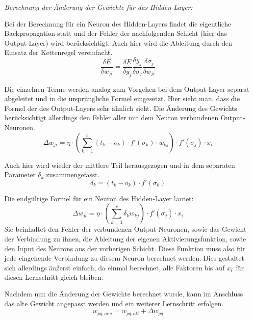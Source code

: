 \emph{Berechnung der Änderung der Gewichte für das Hidden-Layer:}

Bei der Berechnung für ein Neuron des Hidden-Layers findet die eigentliche Backpropagation statt und der Fehler der nachfolgenden Schicht (hier das Output-Layer) wird berücksichtigt. Auch hier wird die Ableitung durch den Einsatz der Kettenregel vereinfacht.
\begin{equation}
\frac{\delta E}{\delta w_{ji}} = \frac{\delta E}{\delta y_j} \frac{\delta y_j}{\delta\sigma_j}\frac{\delta\sigma_j}{\delta w_{ji}}
\end{equation}

Die einzelnen Terme werden analog zum Vorgehen bei dem Output-Layer separat abgeleitet und in die ursprüngliche Formel eingesetzt. Hier sieht man, dass die Formel der des Output-Layers sehr ähnlich sieht. Die Änderung des Gewichts berücksichtigt allerdings den Fehler aller mit dem Neuron verbundenen Output-Neuronen.
\begin{equation}
\Delta w_{ji} = \eta \cdot \left(\sum_{k=1}^{c}(t_k-o_k)\cdot f'(\sigma_k)\cdot w_{kj}\right) \cdot f'(\sigma_j) \cdot x_i
\end{equation}

Auch hier wird wieder der mittlere Teil herausgezogen und in dem separaten Parameter $\delta_k$ zusammengefasst.
\begin{equation}
\delta_k = (t_k-o_k)\cdot f'(\sigma_k)
\end{equation}

Die endgültige Formel für ein Neuron des Hidden-Layer lautet:
\begin{equation}
\Delta w_{ji}=\eta \cdot \left(\sum_{k=1}^{c} \delta_k w_{kj}\right)\cdot f'(\sigma_j)\cdot x_i
\end{equation}
Sie beinhaltet den Fehler der verbundenen Output-Neuronen, sowie das Gewicht der Verbindung zu ihnen, die Ableitung der eigenen Aktivierungsfunktion, sowie den Input des Neurons aus der vorherigen Schicht. Diese Funktion muss also für jede eingehende Verbindung zu diesem Neuron berechnet werden. Dies gestaltet sich allerdings äußerst einfach, da einmal berechnet, alle Faktoren bis auf $x_i$ für diesen Lernschritt gleich bleiben.

Nachdem nun die Änderung der Gewichte berechnet wurde, kann im Anschluss das alte Gewicht angepasst werden und ein weiterer Lernschritt erfolgen.
\begin{equation}
w_{pq, neu}=w_{pq, alt}+\Delta w_{pq}
\end{equation}


